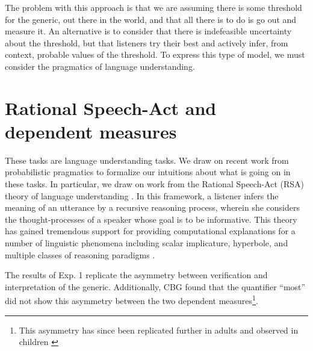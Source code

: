\documentclass[10pt,letterpaper]{article}
\begin{document}
The problem with this approach is that we are assuming there is some threshold for the generic, out there in the world, and that all there is to do is go out and measure it. An alternative is to consider that there is indefeasible uncertainty about the threshold, but that listeners try their best and actively infer, from context, probable values of the threshold. To express this type of model, we must consider the pragmatics of language understanding. 


\section{Rational Speech-Act and dependent measures}


These tasks are language understanding tasks. We draw on recent work from probabilistic pragmatics to formalize our intuitions about what is going on in these tasks. In particular, we draw on work from the Rational Speech-Act (RSA) theory of language understanding \cite{Frank2012}. In this framework, a listener infers the meaning of an utterance by a recursive reasoning process, wherein she considers the thought-processes of a speaker whose goal is to be informative. This theory has gained tremendous support for providing computational explanations for a number of linguistic phenomena including scalar implicature, hyperbole, and multiple classes of reasoning paradigms \cite{Goodman2013, Kao2014, Tessler2014, Lassiter2014}. 

The results of Exp. 1 replicate the asymmetry between verification and interpretation of the generic. Additionally, CBG  found that the quantifier ``most'' did not show this asymmetry between the two dependent measures\footnote{This asymmetry has since been replicated further in adults and observed in children \cite{Brandone2014}}. 
\end{document}

